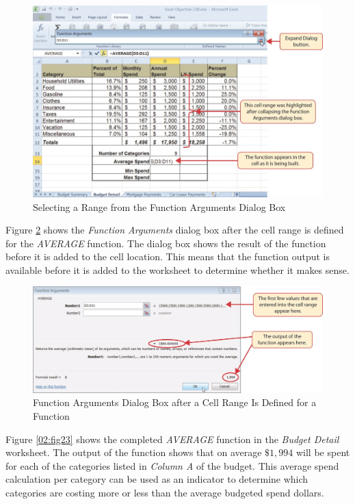 \begin{figure}[H]
	\centering
	\includegraphics[width=\maxwidth{.95\linewidth}]{gfx/ch02_fig21}
	\caption{Selecting a Range from the Function Arguments Dialog Box}
	\label{02:fig21}
\end{figure}

Figure \ref{02:fig22} shows the \textit{Function Arguments} dialog box after the cell range is defined for the \textit{AVERAGE} function. The dialog box shows the result of the function before it is added to the cell location. This means that the function output is available before it is added to the worksheet to determine whether it makes sense.

\begin{figure}[H]
	\centering
	\includegraphics[width=\maxwidth{.95\linewidth}]{gfx/ch02_fig22}
	\caption{Function Arguments Dialog Box after a Cell Range Is Defined for a Function}
	\label{02:fig22}
\end{figure}

Figure \ref{02:fig23} shows the completed \textit{AVERAGE} function in the \textit{Budget Detail} worksheet. The output of the function shows that on average $ \$1,994 $ will be spent for each of the categories listed in \textit{Column A} of the budget. This average spend calculation per category can be used as an indicator to determine which categories are costing more or less than the average budgeted spend dollars.

